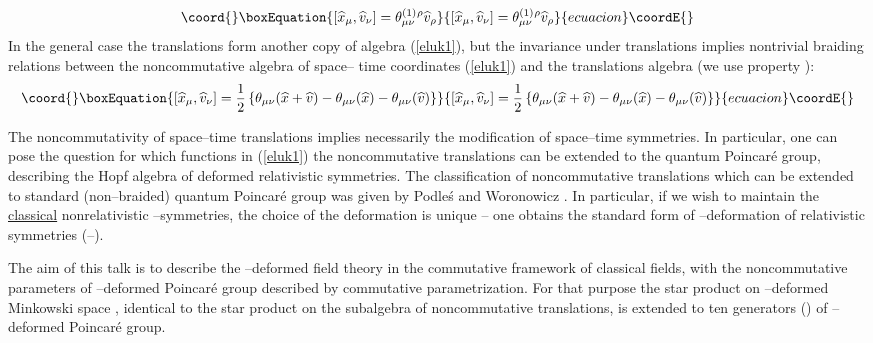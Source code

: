 \documentclass[a4paper,12pt]{article}
\begin{document}
\begin{equation}\coord{}\boxEquation{
\label{eluk4}
\left[  \widehat{x}_{\mu}, \widehat{v}_{\nu} \right]
=
\theta_{\mu\nu}^{(1)}  {}^{\rho}\widehat{v}_{\rho}
}{
\left[  \widehat{x}_{\mu}, \widehat{v}_{\nu} \right]
=
\theta_{\mu\nu}^{(1)}  {}^{\rho}\widehat{v}_{\rho}
}{ecuacion}\coordE{}\end{equation}
 In the general case the translations  form another  copy of algebra
 (\ref{eluk1}), but     the invariance under translations implies 
nontrivial
 braiding relations between the noncommutative algebra of space--
time coordinates
 (\ref{eluk1}) and the translations  algebra  (we use property
 \myHighlight{$\theta_{\mu\nu}= - \theta_{\nu\mu}$}\coordHE{}):
\begin{equation}\coord{}\boxEquation{
\label{eluk5}
\left[  \widehat{x}_{\mu}, \widehat{v}_{\nu} \right]
=
{1\over 2}
 \left\{
 \theta_{\mu\nu}(\widehat{x} +\widehat{v})
 - \theta_{\mu\nu}(\widehat{x}) - \theta_{\mu\nu}
 (\widehat{v}) \right\}
}{
\left[  \widehat{x}_{\mu}, \widehat{v}_{\nu} \right]
=
{1\over 2}
 \left\{
 \theta_{\mu\nu}(\widehat{x} +\widehat{v})
 - \theta_{\mu\nu}(\widehat{x}) - \theta_{\mu\nu}
 (\widehat{v}) \right\}
}{ecuacion}\coordE{}\end{equation}

The noncommutativity of space--time translations implies
necessarily the modification of space--time symmetries. In
particular, one can pose the question  for which functions
 \coordHE{} in (\ref{eluk1}) the
 noncommutative translations \coordHE{} can be
 extended to the quantum Poincar\'{e} group, describing the Hopf
 algebra of deformed relativistic symmetries. The classification
 of noncommutative translations which can be extended to standard
 (non--braided) quantum Poincar\'{e} group   was given by
 Podle\'{s} and Woronowicz \cite{rluk10}. In particular, if we
 wish
 to maintain the \underline{classical} nonrelativistic
 \coordHE{}--symmetries, the choice of the deformation is unique -- one
 obtains the standard form of \myHighlight{$\kappa$}\coordHE{}--deformation of
 relativistic  symmetries (\cite{rluk11}--\cite{rluk13}).

 The aim of  this talk is to describe the \myHighlight{$\kappa$}\coordHE{}--deformed
 field theory in the commutative framework of classical fields,
 with the noncommutative parameters of \myHighlight{$\kappa$}\coordHE{}--deformed
 Poincar\'{e} group described  by  commutative
 parametrization. For that purpose the star  product on
 \myHighlight{$\kappa$}\coordHE{}--deformed Minkowski space     \cite{rluk14}, identical
 to the star product on the subalgebra of noncommutative
 translations, is  extended to ten generators
 (\coordHE{}) of
  \myHighlight{$\kappa$}\coordHE{}--deformed Poincar\'{e} group.
\end{document}
